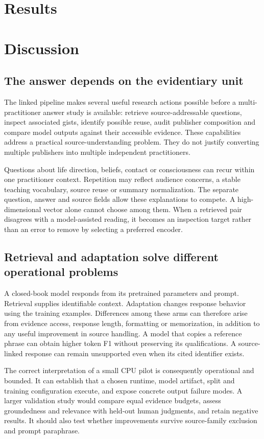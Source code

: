 \section{Results}


\section{Discussion}
\subsection{The answer depends on the evidentiary unit}
The linked pipeline makes several useful research actions possible before a multi-practitioner answer study is available: retrieve source-addressable questions, inspect associated gists, identify possible reuse, audit publisher composition and compare model outputs against their accessible evidence. These capabilities address a practical source-understanding problem. They do not justify converting multiple publishers into multiple independent practitioners.

Questions about life direction, beliefs, contact or consciousness can recur within one practitioner context. Repetition may reflect audience concerns, a stable teaching vocabulary, source reuse or summary normalization. The separate question, answer and source fields allow these explanations to compete. A high-dimensional vector alone cannot choose among them. When a retrieved pair disagrees with a model-assisted reading, it becomes an inspection target rather than an error to remove by selecting a preferred encoder.

\subsection{Retrieval and adaptation solve different operational problems}
A closed-book model responds from its pretrained parameters and prompt. Retrieval supplies identifiable context. Adaptation changes response behavior using the training examples. Differences among these arms can therefore arise from evidence access, response length, formatting or memorization, in addition to any useful improvement in source handling. A model that copies a reference phrase can obtain higher token F1 without preserving its qualifications. A source-linked response can remain unsupported even when its cited identifier exists.

The correct interpretation of a small CPU pilot is consequently operational and bounded. It can establish that a chosen runtime, model artifact, split and training configuration execute, and expose concrete output failure modes. A larger validation study would compare equal evidence budgets, assess groundedness and relevance with held-out human judgments, and retain negative results. It should also test whether improvements survive source-family exclusion and prompt paraphrase.

